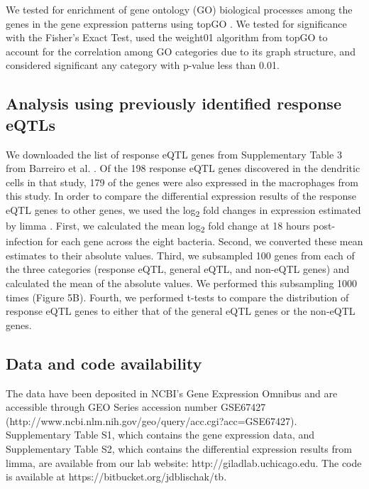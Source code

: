We tested for enrichment of gene ontology (GO) biological processes
among the genes in the gene expression patterns using topGO
\citep{Alexa2006}. We tested for significance with the Fisher's Exact
Test, used the weight01 algorithm from topGO to account for the
correlation among GO categories due to its graph structure, and
considered significant any category with p-value less than 0.01.

\subsection{Analysis using previously identified response
eQTLs}\label{analysis-using-previously-identified-response-eqtls}

We downloaded the list of response eQTL genes from Supplementary Table 3
from Barreiro et al. \citep{Barreiro2012}. Of the 198 response eQTL genes
discovered in the dendritic cells in that study, 179 of the genes were
also expressed in the macrophages from this study. In order to compare
the differential expression results of the response eQTL genes to other
genes, we used the log\textsubscript{2} fold changes in expression
estimated by limma \citep{Ritchie2015}. First, we calculated the mean
log\textsubscript{2} fold change at 18 hours post-infection for each
gene across the eight bacteria. Second, we converted these mean
estimates to their absolute values. Third, we subsampled 100 genes from
each of the three categories (response eQTL, general eQTL, and non-eQTL
genes) and calculated the mean of the absolute values. We performed this
subsampling 1000 times (Figure 5B). Fourth, we performed t-tests to
compare the distribution of response eQTL genes to either that of the
general eQTL genes or the non-eQTL genes.

\subsection{Data and code
availability}\label{data-and-code-availability}

The data have been deposited in NCBI's Gene Expression Omnibus
\citep{Edgar2002} and are accessible through GEO Series accession number
GSE67427 (http://www.ncbi.nlm.nih.gov/geo/query/acc.cgi?acc=GSE67427).
Supplementary Table S1, which contains the gene expression data, and
Supplementary Table S2, which contains the differential expression
results from limma, are available from our lab website:
http://giladlab.uchicago.edu. The code is available at
https://bitbucket.org/jdblischak/tb.

